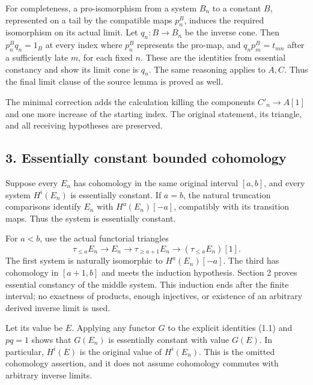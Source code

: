 \documentclass[11pt]{article}
\begin{document}
For completeness,\allowbreak{} a pro-isomorphism from a system \(B_n\) to a constant \(B\),\allowbreak{} represented on a tail by the compatible maps \(p^B_n\),\allowbreak{} induces the required isomorphism on its actual limit. Let \(q_n:B\to B_n\) be the inverse cone. Then \(p^B_nq_n=1_B\) at every index where \(p^B_n\) represents the pro-map,\allowbreak{} and \(q_n p^B_m=t_{mn}\) after a sufficiently late \(m\),\allowbreak{} for each fixed \(n\). These are the identities from essential constancy and show its limit cone is \(q_n\). The same reasoning applies to \(A,C\). Thus the final limit clause of the source lemma is proved as well.

The minimal correction adds the calculation killing the components \(C'_n\to A[1]\) and one more increase of the starting index. The original statement,\allowbreak{} its triangle,\allowbreak{} and all receiving hypotheses are preserved.

\subsection{3. Essentially constant bounded cohomology}\label{proofs-12380-12604-essentially-constant-bounded-cohomology}

Suppose every \(E_n\) has cohomology in the same original interval \([a,b]\),\allowbreak{} and every system \(H^i(E_n)\) is essentially constant. If \(a=b\),\allowbreak{} the natural truncation comparisons identify \(E_n\) with \(H^a(E_n)[-a]\),\allowbreak{} compatibly with its transition maps. Thus the system is essentially constant.

For \(a<b\),\allowbreak{} use the actual functorial triangles \[
\tau_{\leq a}E_n\longrightarrow E_n\longrightarrow
\tau_{\geq a+1}E_n\longrightarrow(\tau_{\leq a}E_n)[1].
\] The first system is naturally isomorphic to \(H^a(E_n)[-a]\). The third has cohomology in \([a+1,b]\) and meets the induction hypothesis. Section 2 proves essential constancy of the middle system. This induction ends after the finite interval; no exactness of products,\allowbreak{} enough injectives,\allowbreak{} or existence of an arbitrary derived inverse limit is used.

Let its value be \(E\). Applying any functor \(G\) to the explicit identities (1.1)\allowbreak{} and \(pq=1\) shows that \(G(E_n)\) is essentially constant with value \(G(E)\). In particular,\allowbreak{} \(H^i(E)\) is the original value of \(H^i(E_n)\). This is the omitted cohomology assertion,\allowbreak{} and it does not assume cohomology commutes with arbitrary inverse limits.
\end{document}
